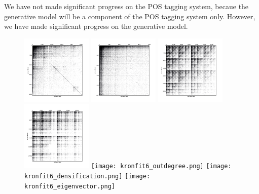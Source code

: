 \documentclass[12pt]{article}
\begin{document}
We have not made significant progress on the POS tagging system, becaue the generative model will be a component of the POS tagging system only. However, we have made significant progress on the generative model.
\begin{figure}
  \includegraphics[width=0.3\textwidth]{bigram_sparsematplot.png}
  \includegraphics[width=0.3\textwidth]{bigram_small_sparsematplot.png}
  \includegraphics[width=0.3\textwidth]{kronfit2_sparsematplot.png}
  \includegraphics[width=0.3\textwidth]{kronfit6_sparsematplot.png}
  \texttt{[image: kronfit6\_outdegree.png]}
  \texttt{[image: kronfit6\_densification.png]}
  \texttt{[image: kronfit6\_eigenvector.png]}
  \caption{} %
\end{figure}
\end{document}
